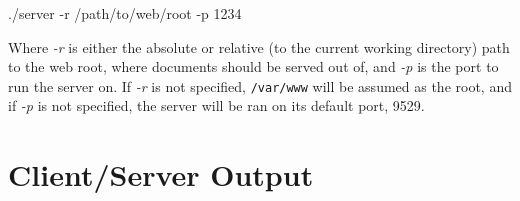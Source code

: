 \documentclass[12pt]{article}
\begin{document}
./server -r /path/to/web/root -p 1234

Where \emph{-r} is either the absolute or relative (to the current working directory) path to the web root, where documents should be served out of, and \emph{-p} is the port to run the server on. If \emph{-r} is not specified, {\tt /var/www} will be assumed as the root, and if \emph{-p} is not specified, the server will be ran on its default port, 9529.

\section{Client/Server Output}
\end{document}

